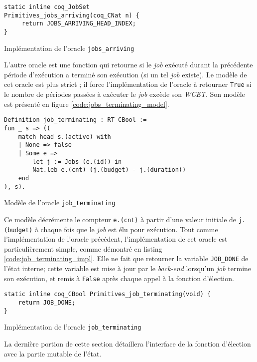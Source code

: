 	\begin{listing}[!ht]
	\begin{verbatim}
static inline coq_JobSet
Primitives_jobs_arriving(coq_CNat n) {
     return JOBS_ARRIVING_HEAD_INDEX;
}
	\end{verbatim}
	\caption{Implémentation de l'oracle \texttt{jobs\_arriving}}
	\label{code:jobs_arriving_impl}
	\end{listing}

	L'autre oracle est une fonction qui retourne si le \emph{job} exécuté durant la précédente période d'exécution a terminé son exécution (si un tel \emph{job} existe). Le modèle de cet oracle est plus strict ; il force l'implémentation de l'oracle à retourner \texttt{True} si le nombre de périodes passées à exécuter le \emph{job} excède son \emph{WCET}. Son modèle est présenté en figure \ref{code:jobs_terminating_model}.

	\begin{listing}[!ht]
	\begin{verbatim}
Definition job_terminating : RT CBool :=
fun _ s => ((
    match head s.(active) with
    | None => false
    | Some e =>
        let j := Jobs (e.(id)) in
        Nat.leb e.(cnt) (j.(budget) - j.(duration))
    end
), s).
	\end{verbatim}
	\caption{Modèle de l'oracle \texttt{job\_terminating}}
	\label{code:jobs_terminating_model}
	\end{listing}

	Ce modèle décrémente le compteur \texttt{e.(cnt)} à partir d'une valeur initiale de \texttt{j.(budget)} à chaque fois que le \emph{job} est élu pour exécution. Tout comme l'implémentation de l'oracle précédent, l'implémentation de cet oracle est particulièrement simple, comme démontré en listing \ref{code:job_terminating_impl}. Elle ne fait que retourner la variable \texttt{JOB\_DONE} de l'état interne; cette variable est mise à jour par le \emph{back-end} lorsqu'un \emph{job} termine son exécution, et remis à \texttt{False} après chaque appel à la fonction d'élection.

	\begin{listing}[!ht]
	\begin{verbatim}
static inline coq_CBool Primitives_job_terminating(void) {
    return JOB_DONE;
}
	\end{verbatim}
	\caption{Implémentation de l'oracle \texttt{job\_terminating}}
	\label{code:job_terminating_impl}
	\end{listing}

	La dernière portion de cette section détaillera l'interface de la fonction d'élection avec la partie mutable de l'état.

